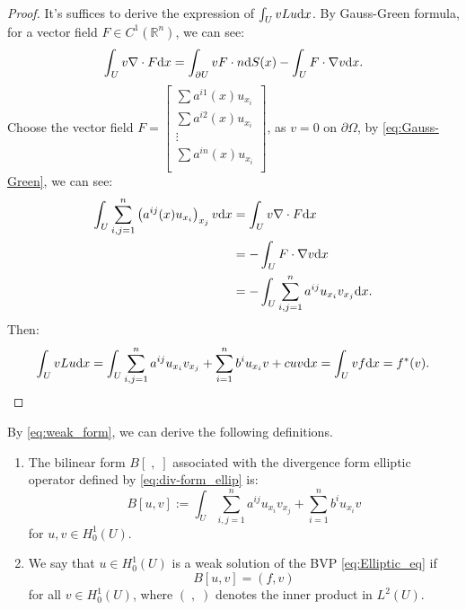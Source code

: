 \begin{proof}
    It's suffices to derive the expression of $\int_{U}vLu\mathrm{d} x$. By Gauss-Green formula, for a vector field $F\in C^{1}(\mathbb{R}^{n})$, we can see:
    \begin{equation}
        \label{eq:Gauss-Green}
        \int_{U}v\nabla\cdot F\mathrm{d} x=\int_{\partial U}v F\cdot n\mathrm{d} S(x)-\int_{U}F\cdot\nabla v\mathrm{d} x.
    \end{equation}
    Choose the vector field $F=\begin{bmatrix}
        \sum a^{i1}(x)u_{x_{i}}\\
        \sum a^{i2}(x)u_{x_{i}}\\
        \vdots\\
        \sum a^{in}(x)u_{x_{i}}\\
    \end{bmatrix}$, as $v=0$ on $\partial \Omega$, by \eqref{eq:Gauss-Green}, we can see:
    \begin{equation}
        \begin{aligned}
            \int_{U}\sum_{i,j=1}^{n}\left(a^{ij}(x)u_{x_{i}}\right)_{x_{j}}v\mathrm{d} x&=\int_{U}v\nabla\cdot F\mathrm{d} x\\
            &=-\int_{U}F\cdot\nabla v\mathrm{d} x\\
            &=-\int_{U}\sum_{i,j=1}^{n}a^{ij}u_{x_{i}}v_{x_{j}}\mathrm{d} x.\\
        \end{aligned}
    \end{equation}
    Then:
    \begin{equation}
        \label{eq:weak}
        \int_{U}vLu\mathrm{d} x=\int_{U}\sum_{i,j=1}^{n}a^{ij}u_{x_{i}}v_{x_{j}}+\sum_{i=1}^{n}b^{i}u_{x_{i}}v+cuv\mathrm{d} x=\int_{U}vf\mathrm{d} x=f^{*}(v).
    \end{equation}
\end{proof}
By \eqref{eq:weak_form}, we can derive the following definitions.
\begin{definition}
    \begin{enumerate}
        \item The bilinear form $B[\;,\;]$ associated with the divergence form elliptic operator defined by \eqref{eq:div-form_ellip} is:
        \begin{equation}
            \label{eq:bilinear_form_B}
            B[u,v]:=\int_{U}\sum_{i,j=1}^{n}a^{ij}u_{x_{i}}v_{x_{j}}+\sum_{i=1}^{n}b^{i}u_{x_{i}}v
        \end{equation}
        for $u,v\in H_{0}^{1}(U)$.
        \item We say that $u\in H_{0}^{1}(U)$ is a weak solution of the BVP \eqref{eq:Elliptic_eq} if 
        \begin{equation}
            B[u,v]=(f,v)
        \end{equation}
        for all $v\in H_{0}^{1}(U)$, where $(\;,\;)$ denotes the inner product in $L^{2}(U)$.
    \end{enumerate}
\end{definition}

